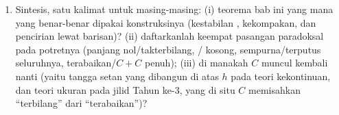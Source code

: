 \begin{problem}[{Soal akhir pekan --- \omterm{pb:b1:topology:1}{himpunan Cantor} sepertiga
tengah: panjang nol, takterbilang, sempurna, dan $C + C =
\intcc{0}{2}$}]
\begin{enumerate}[resume]
  \item Sintesis, satu kalimat untuk masing-masing: (i) teorema bab ini
        yang mana yang benar-benar dipakai konstruksinya (kestabilan
        , kekompakan, dan pencirian
        lewat barisan)? (ii) daftarkanlah keempat pasangan paradoksal
        pada potretnya (panjang nol/takterbilang,
        / kosong, sempurna/terputus seluruhnya,
        terabaikan/$C+C$ penuh); (iii) di manakah $C$ muncul kembali
        nanti (yaitu tangga setan yang dibangun di atas $h$ pada teori
        kekontinuan, dan teori ukuran pada jilid Tahun ke-3,
        yang di situ $C$ memisahkan ``terbilang'' dari
        ``terabaikan'')?

\end{enumerate}
\end{problem}
